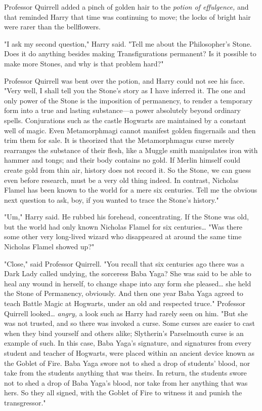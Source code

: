 Professor Quirrell added a pinch of golden hair to the \emph{potion of 
effulgence,} and that reminded Harry that time was continuing to move; the 
locks of bright hair were rarer than the bellflowers.

"I ask my second question," Harry said. "Tell me about the Philosopher's Stone. 
Does it do anything besides making Transfigurations permanent? Is it possible 
to make more Stones, and why is that problem hard?"

Professor Quirrell was bent over the potion, and Harry could not see his face. 
"Very well, I shall tell you the Stone's story as I have inferred it. The one 
and only power of the Stone is the imposition of permanency, to render a 
temporary form into a true and lasting substance---a power absolutely beyond 
ordinary spells. Conjurations such as the castle Hogwarts are maintained by a 
constant well of magic. Even Metamorphmagi cannot manifest golden fingernails 
and then trim them for sale. It is theorized that the Metamorphmagus curse 
merely rearranges the substance of their flesh, like a Muggle smith manipulates 
iron with hammer and tongs; and their body contains no gold. If Merlin himself 
could create gold from thin air, history does not record it. So the Stone, we 
can guess even before research, must be a very old thing indeed. In contrast, 
Nicholas Flamel has been known to the world for a mere six centuries. Tell me 
the obvious next question to ask, boy, if you wanted to trace the Stone's 
history."

"Um," Harry said. He rubbed his forehead, concentrating. If the Stone was old, 
but the world had only known Nicholas Flamel for six centuries{\ldots} "Was 
there some other very long-lived wizard who disappeared at around the same time 
Nicholas Flamel showed up?"

"Close," said Professor Quirrell. "You recall that six centuries ago there was 
a Dark Lady called undying, the sorceress Baba Yaga? She was said to be able to 
heal any wound in herself, to change shape into any form she pleased{\ldots} 
she held the Stone of Permanency, obviously. And then one year Baba Yaga agreed 
to teach Battle Magic at Hogwarts, under an old and respected truce." Professor 
Quirrell looked{\ldots} \emph{angry,} a look such as Harry had rarely seen on 
him. "But she was not trusted, and so there was invoked a curse. Some curses 
are easier to cast when they bind yourself and others alike; Slytherin's 
Parselmouth curse is an example of such. In this case, Baba Yaga's signature, 
and signatures from every student and teacher of Hogwarts, were placed within 
an ancient device known as the Goblet of Fire. Baba Yaga swore not to shed a 
drop of students' blood, nor take from the students anything that was theirs. 
In return, the students swore not to shed a drop of Baba Yaga's blood, nor take 
from her anything that was hers. So they all signed, with the Goblet of Fire to 
witness it and punish the transgressor."

